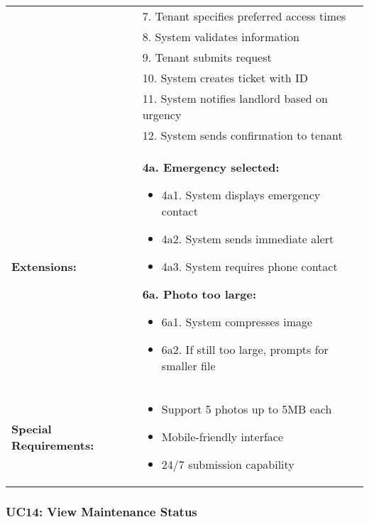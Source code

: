 \documentclass[12pt]{article}
\begin{document}
\begin{longtable}{|p{3cm}|p{11cm}|}
& 7. Tenant specifies preferred access times \\
& 8. System validates information \\
& 9. Tenant submits request \\
& 10. System creates ticket with ID \\
& 11. System notifies landlord based on urgency \\
& 12. System sends confirmation to tenant \\
\hline
\textbf{Extensions:} & 
\textbf{4a. Emergency selected:}
\begin{itemize}
    \item 4a1. System displays emergency contact
    \item 4a2. System sends immediate alert
    \item 4a3. System requires phone contact
\end{itemize}
\textbf{6a. Photo too large:}
\begin{itemize}
    \item 6a1. System compresses image
    \item 6a2. If still too large, prompts for smaller file
\end{itemize} \\
\hline
\textbf{Special Requirements:} & 
\begin{itemize}
    \item Support 5 photos up to 5MB each
    \item Mobile-friendly interface
    \item 24/7 submission capability
\end{itemize} \\
\hline
\end{longtable}

\subsubsection{UC14: View Maintenance Status}
\end{document}
